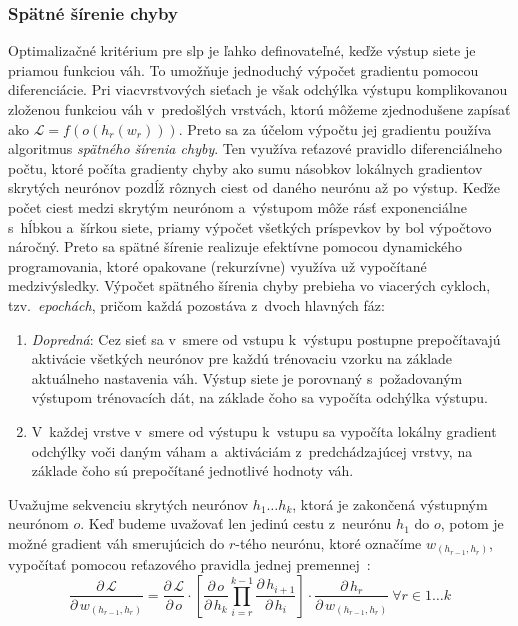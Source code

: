   \subsubsection{Spätné šírenie chyby}

    Optimalizačné kritérium pre \acrshort{slp} je ľahko definovateľné, keďže výstup siete je priamou funkciou váh. To umožňuje jednoduchý výpočet gradientu pomocou diferenciácie. Pri viacvrstvových sieťach je však odchýlka výstupu komplikovanou zloženou funkciou váh v~predošlých vrstvách, ktorú môžeme zjednodušene zapísať ako $\mathcal{L} = f(o(h_r(w_r)))$. Preto sa za účelom výpočtu jej gradientu používa algoritmus \emph{spätného šírenia chyby}. Ten využíva reťazové pravidlo diferenciálneho počtu, ktoré počíta gradienty chyby ako sumu násobkov lokálnych gradientov skrytých neurónov pozdĺž rôznych ciest od daného neurónu až po výstup. Keďže počet ciest medzi skrytým neurónom a~výstupom môže rásť exponenciálne s~hĺbkou a~šírkou siete, priamy výpočet všetkých príspevkov by bol výpočtovo náročný. Preto sa spätné šírenie realizuje efektívne pomocou dynamického programovania, ktoré opakovane (rekurzívne) využíva už vypočítané medzivýsledky. Výpočet spätného šírenia chyby prebieha vo viacerých cykloch, tzv.\ \emph{epochách}, pričom každá pozostáva z~dvoch hlavných fáz:
    \begin{enumerate}
      \item \emph{Dopredná}: Cez sieť sa v~smere od vstupu k~výstupu postupne prepočítavajú aktivácie všetkých neurónov pre každú trénovaciu vzorku na základe aktuálneho nastavenia váh. Výstup siete je porovnaný s~požadovaným výstupom trénovacích dát, na základe čoho sa vypočíta odchýlka výstupu.
      \item V~každej vrstve v~smere od výstupu k~vstupu sa vypočíta lokálny gradient odchýlky voči daným váham a~aktiváciám z~predchádzajúcej vrstvy, na základe čoho sú prepočítané jednotlivé hodnoty váh.
    \end{enumerate}

    Uvažujme sekvenciu skrytých neurónov $h_1 \dots h_k$, ktorá je zakončená výstupným neurónom $o$. Keď budeme uvažovať len jedinú cestu z~neurónu $h_1$ do $o$, potom je možné gradient váh smerujúcich do $r$-tého neurónu, ktoré označíme $w_{(h_{r-1},h_r)}$, vypočítať pomocou reťazového pravidla jednej premennej~\cite{aggarwalNeuralNetworksDeep2018}:
    \begin{equation}
      \frac{\partial\, \mathcal{L}}{\partial\, w_{(h_{r-1},h_r)}} = \frac{\partial\, \mathcal{L}}{\partial\, o} \cdot
        \left[ \frac{\partial\, o}{\partial\, h_k} \prod_{i=r}^{k-1} \frac{\partial\, h_{i+1}}{\partial\, h_i}
        \right] \cdot
        \frac{\partial\, h_r}{\partial\, w_{(h_{r-1},h_r)}} 
        \ \forall r \in 1 \dots k
        \label{eq:chain-rule-single}
    \end{equation}

